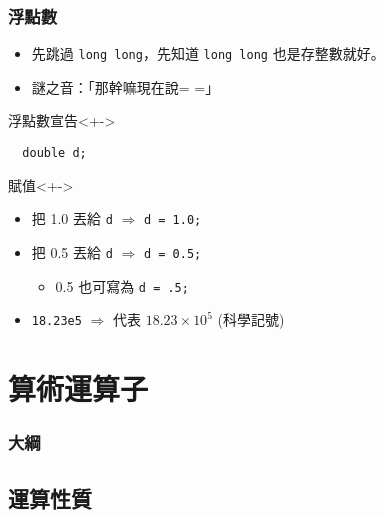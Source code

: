 \documentclass[utf8]{beamer}
\begin{document}
\begin{CJK}{UTF8}{bkai}
\begin{frame}[fragile]
  \frametitle{浮點數}
  \begin{itemize}[<+->]
    \item 先跳過 \lstinline{long long}，先知道 \lstinline{long long} 也是存整數就好。
    \item 謎之音：「那幹嘛現在說= =」
  \end{itemize}
  \begin{alertblock}{浮點數宣告}<+->
    \begin{lstlisting}
  double d;
    \end{lstlisting}
  \end{alertblock}
  \begin{exampleblock}{賦值}<+->
    \begin{itemize}
    \item 把 1.0 丟給 \lstinline{d} $\Rightarrow$ \lstinline{d = 1.0;}
    \item<+-> 把 0.5 丟給 \lstinline{d} $\Rightarrow$ \lstinline{d = 0.5;}
      \begin{itemize}[<+->]
      \item 0.5 也可寫為 \lstinline{d = .5;}
      \end{itemize}
    \item<+-> \lstinline{18.23e5} $\Rightarrow$ 代表 $18.23\times{10^5}$ (\alert{科學記號})
    \end{itemize}
  \end{exampleblock}
\end{frame}

\section{算術運算子}
\begin{frame}
  \frametitle{大綱}
  \begin{multicols}{2}
    \tableofcontents[currentsection]
  \end{multicols}
\end{frame}

\subsection{運算性質}


\end{CJK}
\end{document}
